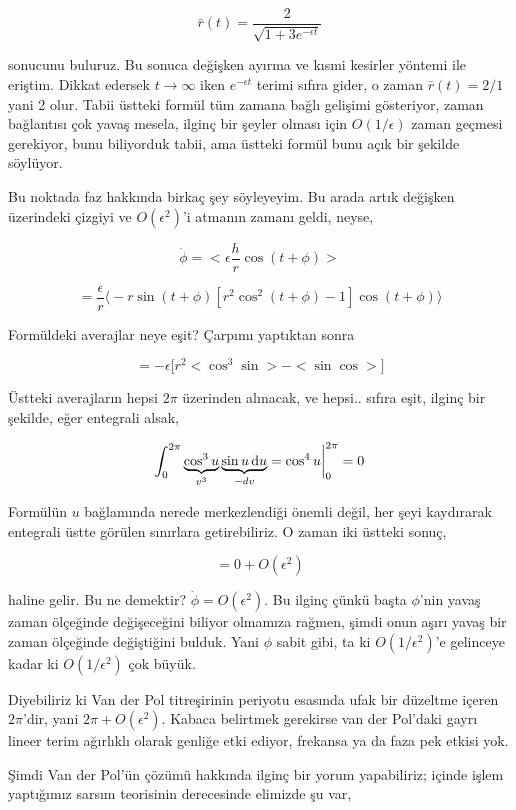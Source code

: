 \documentclass[12pt,fleqn]{article}\usepackage{../../common}
\begin{document}
$$ \bar{r}(t) = \frac{2}{\sqrt{ 1 + 3 e^{-\epsilon t}}} $$

sonucunu buluruz. Bu sonuca değişken ayırma ve kısmi kesirler yöntemi ile
eriştim. Dikkat edersek $t \to \infty$ iken $e^{-\epsilon t}$ terimi sıfıra
gider, o zaman $\bar{r}(t) = 2/1$ yani 2 olur. Tabii üstteki formül tüm zamana
bağlı gelişimi gösteriyor, zaman bağlantısı çok yavaş mesela, ilginç bir şeyler
olması için $O(1/\epsilon)$ zaman geçmesi gerekiyor, bunu biliyorduk tabii, ama
üstteki formül bunu açık bir şekilde söylüyor.

Bu noktada faz hakkında birkaç şey söyleyeyim. Bu arada artık değişken
üzerindeki çizgiyi ve $O(\epsilon^2)$'i atmanın zamanı geldi, neyse,

$$ \dot{\phi} = < \epsilon \frac{h}{r} \cos(t+\phi) > $$

$$ = \frac{\epsilon}{r}
\bigl\langle
-r \sin (t+\phi) [r^2 \cos^2 (t+\phi) - 1] \cos (t+\phi)
\bigr\rangle
$$

Formüldeki averajlar neye eşit? Çarpımı yaptıktan sonra

$$ = -\epsilon \big[ r^2 < \cos^3 \sin > - < \sin \cos > \big]
$$

Üstteki averajların hepsi $2\pi$ üzerinden alınacak, ve hepsi.. sıfıra eşit,
ilginç bir şekilde, eğer entegrali alsak,

$$ \int_{0}^{2\pi}
\underbrace{\cos^3 u}_{v^3}
\underbrace{\sin u \,\mathrm{d} u}_{-dv}  = \cos^4 u \biggr|_{0}^{2\pi}  = 0$$

Formülün $u$ bağlamında nerede merkezlendiği önemli değil, her şeyi kaydırarak
entegrali üstte görülen sınırlara getirebiliriz. O zaman iki üstteki sonuç,

$$ = 0 + O(\epsilon^2)
$$

haline gelir. Bu ne demektir? $\dot{\phi} = O(\epsilon^2)$. Bu ilginç çünkü
başta $\phi$'nin yavaş zaman ölçeğinde değişeceğini biliyor olmamıza rağmen,
şimdi onun aşırı yavaş bir zaman ölçeğinde değiştiğini bulduk. Yani $\phi$ sabit
gibi, ta ki $O(1/\epsilon^2)$'e gelinceye kadar ki $O(1/\epsilon^2)$ çok büyük. 

Diyebiliriz ki Van der Pol titreşirinin periyotu esasında ufak bir düzeltme
içeren $2\pi$'dir, yani $2\pi + O(\epsilon^2)$. Kabaca belirtmek gerekirse
van der Pol'daki gayrı lineer terim ağırlıklı olarak genliğe etki ediyor,
frekansa ya da faza pek etkisi yok.

Şimdi Van der Pol'ün çözümü hakkında ilginç bir yorum yapabiliriz; içinde işlem
yaptığımız sarsım teorisinin derecesinde elimizde şu var,
\end{document}
